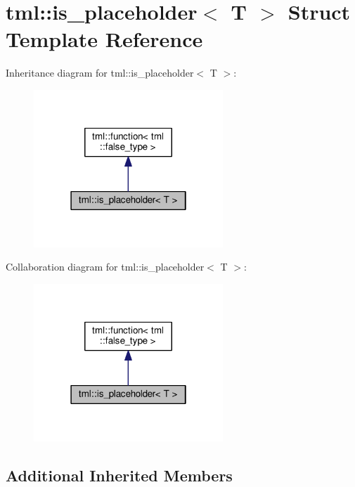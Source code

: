 \hypertarget{structtml_1_1is__placeholder}{\section{tml\+:\+:is\+\_\+placeholder$<$ T $>$ Struct Template Reference}
\label{structtml_1_1is__placeholder}
}


Inheritance diagram for tml\+:\+:is\+\_\+placeholder$<$ T $>$\+:
\nopagebreak
\begin{figure}[H]
\begin{center}
\leavevmode
\includegraphics[width=202pt]{structtml_1_1is__placeholder__inherit__graph}
\end{center}
\end{figure}


Collaboration diagram for tml\+:\+:is\+\_\+placeholder$<$ T $>$\+:
\nopagebreak
\begin{figure}[H]
\begin{center}
\leavevmode
\includegraphics[width=202pt]{structtml_1_1is__placeholder__coll__graph}
\end{center}
\end{figure}
\subsection*{Additional Inherited Members}


